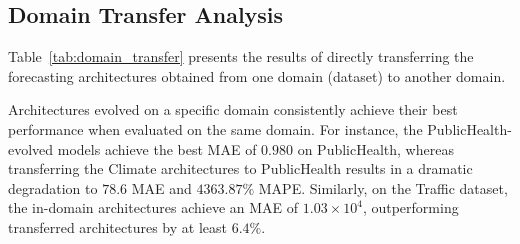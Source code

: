 \begin{nolinenumbers}
\begin{table}[htbp]
\centering
\caption{Domain transfer results. Full results are in Appendix~\ref{app:domain_tranfer}. All values are average MAE and MAPE (\%) across all conditions. Red background: best result; blue background: second-best result.}
\label{tab:domain_transfer}
\small
\setlength{\tabcolsep}{2pt}
\end{table}
\end{nolinenumbers}

\subsection{Domain Transfer Analysis}

Table~\ref{tab:domain_transfer} presents the results of directly transferring the forecasting architectures obtained from one domain (dataset) to another domain.

Architectures evolved on a specific domain consistently achieve their best performance when evaluated on the same domain. For instance, the PublicHealth-evolved models achieve the best MAE of $0.980$ on PublicHealth, whereas transferring the Climate architectures to PublicHealth results in a dramatic degradation to $78.6$ MAE and $4363.87\%$ MAPE. Similarly, on the Traffic dataset, the in-domain architectures achieve an MAE of $1.03\times10^4$, outperforming transferred architectures by at least $6.4\%$.

